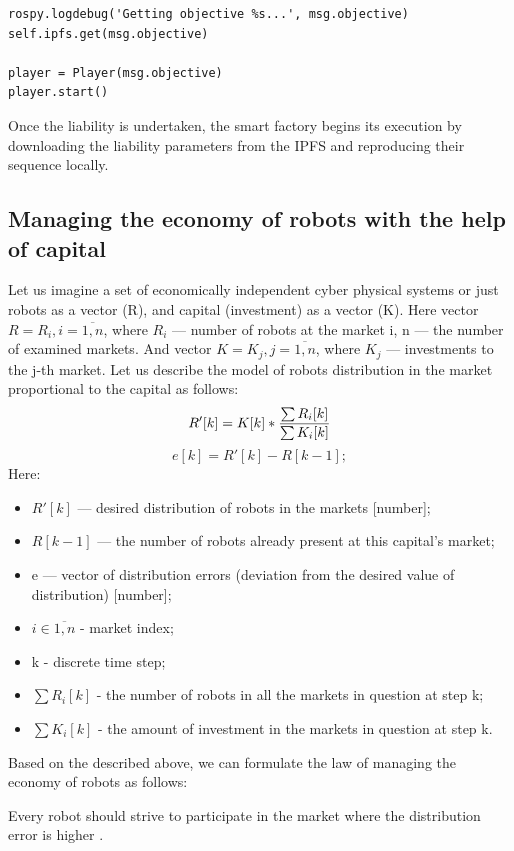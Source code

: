 \documentclass{article}
\begin{document}
\begin{lstlisting}
rospy.logdebug('Getting objective %s...', msg.objective)
self.ipfs.get(msg.objective)

player = Player(msg.objective)
player.start()
\end{lstlisting}

Once the liability is undertaken, the smart factory begins its execution by downloading the liability parameters from the IPFS and reproducing their sequence locally.

\subsection{Managing the economy of robots with the help of capital}

Let us imagine a set of economically independent cyber physical systems or just robots as a vector (R), and capital (investment) as a vector (K). Here vector $ R = {R_i, i=\overline{1,n}}$, where $R_i$ — number of robots at the market i, n — the number of examined markets. And vector $ K = {K_j, j=\overline{1,n}} $, where  $K_j$ — investments to the j-th market. Let us describe the model of robots distribution in the market proportional to the capital as follows: 
\[
R'[k] = K[k] * { \sum R_i[k] \over \sum K_i[k] }
\]
\[
e[k] = R'[k] - R[k-1] ;
\]
Here:
\begin{itemize}
\item $R'[k]$ — desired distribution of robots in the markets [number];
\item $R[k-1]$ — the number of robots already present at this capital's market;
\item e — vector of distribution errors (deviation from the desired value of distribution) [number];
\item $i \in \overline{1,n}$ - market index;
\item k - discrete time step;
\item $\sum R_i[k] $ - the number of robots in all the markets in question at step k;
\item $\sum K_i[k] $ - the amount of investment in the markets in question at step k.
\end{itemize}

Based on the described above, we can formulate the law of managing the economy of robots as follows:

Every robot should strive to participate in the market where the distribution error is higher \cite{LonshakovSergey2017HowProtocol}.
\end{document}
